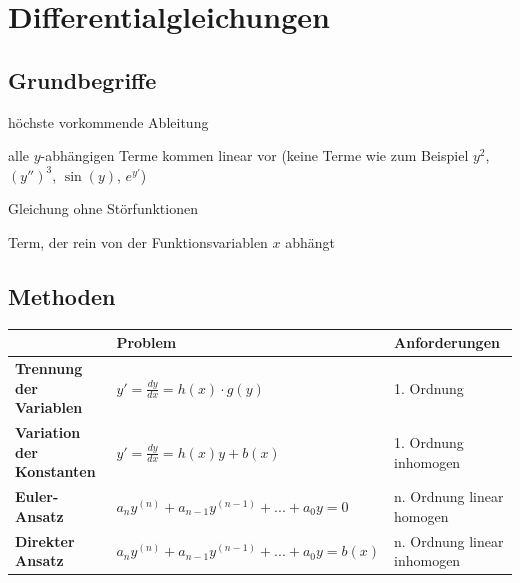 \documentclass[11pt]{article}
\begin{document}
\section{Differentialgleichungen}

\subsection{Grundbegriffe}

\begin{description}[labelindent=16pt,style=multiline,leftmargin=3.5cm, noitemsep]
	\item[Ordnung:] h{\"o}chste vorkommende Ableitung
	\item[linear:] alle $y$-abh{\"a}ngigen Terme kommen linear vor (keine Terme wie zum Beispiel $y^2$, $(y'')^3$, $\sin(y)$, $e^{y'}$)
	\item[homogen:] Gleichung ohne St{\"o}rfunktionen
	\item[St{\"o}rfunktion:] Term, der rein von der Funktionsvariablen $x$ abh{\"a}ngt
\end{description}

\subsection{Methoden}

\begin{table}[H]
\centering
\begin{tabular}{|p{5cm}|p{6cm}|p{3cm}|}
\hline
                                  	& \textbf{Problem} 							& \textbf{Anforderungen} 			\\ \hline
\textbf{Trennung der Variablen}   	& $y' = \frac{dy}{dx} = h(x) \cdot g(y)$ 	& 1. Ordnung			            \\ \hline
\textbf{Variation der Konstanten}	& $y' = \frac{dy}{dx} = h(x)y + b(x)$	 	& 1. Ordnung \filbreak inhomogen	\\ \hline
\textbf{Euler-Ansatz}				& $a_{n}y^{(n)} + a_{n-1}y^{(n-1)} + ... + a_{0}y = 0$	 	& n. Ordnung \filbreak linear \filbreak homogen	\\ \hline
\textbf{Direkter Ansatz}				& $a_{n}y^{(n)} + a_{n-1}y^{(n-1)} + ... + a_{0}y = b(x)$	& n. Ordnung \filbreak linear \filbreak inhomogen	\\ \hline

\end{tabular}
\end{table}
\end{document}
